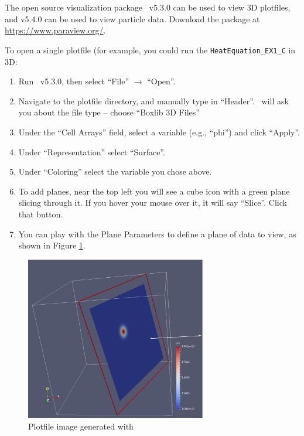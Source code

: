 \section{\paraview}
The open source visualization package \paraview\ v5.3.0 can be used to view 
3D plotfiles, and v5.4.0 can be used to view particle data.  Download
the package at \url{https://www.paraview.org/}.  

To open a single plotfile (for example, you could run the {\tt HeatEquation\_EX1\_C} in 3D:
\begin{enumerate}
\item Run \paraview\ v5.3.0, then select ``File'' $\rightarrow$ ``Open''.
\item Navigate to the plotfile directory, and manually type in ``Header''.
      \paraview\ will ask you about the file type -- choose ``Boxlib 3D Files''
\item Under the ``Cell Arrays'' field, select a variable (e.g., ``phi'') 
      and click ``Apply''.
\item Under ``Representation'' select ``Surface''.
\item Under ``Coloring'' select the variable you chose above.
\item To add planes, near the top left you will see a cube icon with a green plane
      slicing through it.  If you hover your mouse over it, it will say ``Slice''.
      Click that button.
\item You can play with the Plane Parameters to define a plane of data to view, as shown
      in Figure \ref{fig:ParaView}.
\end{enumerate}

\begin{figure}[tb]
\centering
\includegraphics[width=3.1in]{./Visualization/ParaView}
\caption{Plotfile image generated with \paraview}
\label{fig:ParaView}
\end{figure}

